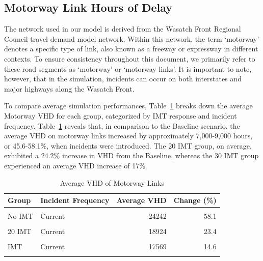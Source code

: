 \documentclass[fancy, oneside, mastersfancy, ms]{byuthesis}
\begin{document}
\hypertarget{motorway-link-hours-of-delay}{%
\subsection{Motorway Link Hours of
Delay}\label{motorway-link-hours-of-delay}}

The network used in our model is derived from the Wasatch Front Regional
Council travel demand model network. Within this network, the term
`motorway' denotes a specific type of link, also known as a freeway or
expressway in different contexts. To ensure consistency throughout this
document, we primarily refer to these road segments as `motorway' or
`motorway links'. It is important to note, however, that in the
simulation, incidents can occur on both interstates and major highways
along the Wasatch Front.

To compare average simulation performances,
Table~\ref{tbl-motorway-delays-table} breaks down the average Motorway
VHD for each group, categorized by IMT response and incident frequency.
Table~\ref{tbl-motorway-delays-table} reveals that, in comparison to the
Baseline scenario, the average VHD on motorway links increased by
approximately 7,000-9,000 hours, or 45.6-58.1\%, when incidents were
introduced. The 20 IMT group, on average, exhibited a 24.2\% increase in
VHD from the Baseline, whereas the 30 IMT group experienced an average
VHD increase of 17\%.

\hypertarget{tbl-motorway-delays-table}{}
\begin{table}
\caption{\label{tbl-motorway-delays-table}Average VHD of Motorway Links }\tabularnewline

\centering
\begin{tabular}[t]{llrr}
\toprule
\textbf{Group} & \textbf{Incident Frequency} & \textbf{Average VHD} & \textbf{Change (\%)}\\
\midrule
\cellcolor{gray!6}{Baseline} & \cellcolor{gray!6}{-} & \cellcolor{gray!6}{15335} & \cellcolor{gray!6}{0.0}\\
No IMT & Current & 24242 & 58.1\\
\cellcolor{gray!6}{No IMT} & \cellcolor{gray!6}{Increased} & \cellcolor{gray!6}{22321} & \cellcolor{gray!6}{45.6}\\
20 IMT & Current & 18924 & 23.4\\
\cellcolor{gray!6}{20 IMT} & \cellcolor{gray!6}{Increased} & \cellcolor{gray!6}{19176} & \cellcolor{gray!6}{25.0}\\
\addlinespace
30 IMT & Current & 17569 & 14.6\\
\cellcolor{gray!6}{30 IMT} & \cellcolor{gray!6}{Increased} & \cellcolor{gray!6}{18327} & \cellcolor{gray!6}{19.5}\\
\bottomrule
\end{tabular}
\end{table}
\end{document}
